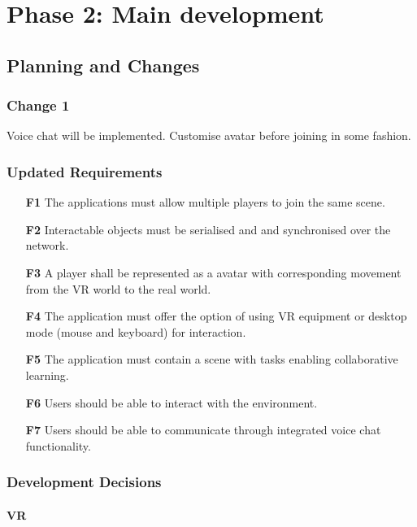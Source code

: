 
\chapter{Phase 2:  Main development}
\label{chap:phase2}

\section{Planning and Changes}


\subsection{Change 1}
Voice chat will be implemented. Customise avatar before joining in some fashion.

\subsection{Updated Requirements}

\begin{enumerate}
  \setlength\itemsep{0em}
  \item [\textbf{F1}] The applications must allow multiple players to join the same scene.
  \item [\textbf{F2}] Interactable objects must be serialised and and synchronised over the network.
  \item [\textbf{F3}] A player shall be represented as a avatar with corresponding movement from the VR world to the real world.
  \item [\textbf{F4}] The application must offer the option of using VR equipment or desktop mode (mouse and keyboard) for interaction.
  \item [\textbf{F5}] The application must contain a scene with tasks enabling collaborative learning.
  \item [\textbf{F6}] Users should be able to interact with the environment.
  \item [\textbf{F7}] Users should be able to communicate through integrated voice chat functionality.
\end{enumerate}

\subsection{Development Decisions}
\subsubsection{VR}


